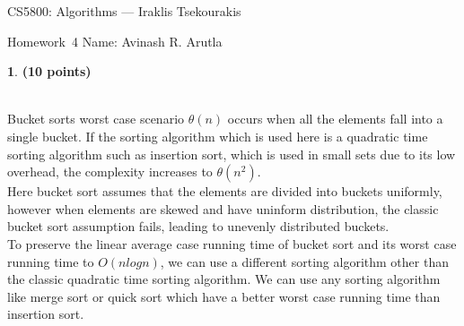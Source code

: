 \documentclass[11pt]{article}
\newcommand{\yourname}{Avinash R. Arutla}
\theoremstyle{definition}
\newcommand{\instructor}{Iraklis Tsekourakis}
\newcommand{\hwnum}{4}
\newtheorem{prob}{}
\newcommand{\solution}{\medskip\noindent{\color{DarkBlue}\textbf{Solution:}}}
\begin{document}
{\Large
\begin{center}{CS5800: Algorithms} --- \instructor \end{center}}
{\large
\vspace{10pt}
\noindent Homework~\hwnum \vspace{2pt}%
}
\bigskip
{\large \noindent Name: \yourname }
\vspace{15pt}





\begin{prob} \textbf{(10 points)}
\end{prob}

\solution \\

Bucket sorts worst case scenario $\theta(n)$ occurs when all the elements fall into a single bucket. If the sorting algorithm
which is used here is a quadratic time sorting algorithm such as insertion sort, which is used in small sets due to its low overhead,
the complexity increases to $\theta(n^2)$.
\\

Here bucket sort assumes that the elements are divided into buckets uniformly, however when elements are skewed and have uninform distribution,
the classic bucket sort assumption fails, leading to unevenly distributed buckets.
\\

To preserve the linear average case running time of bucket sort and its worst case running time to $O(nlogn)$, we can use a different sorting algorithm
other than the classic quadratic time sorting algorithm. We can use any sorting algorithm like merge sort or quick sort which have a better worst case
running time than insertion sort.
\\
\end{document}
